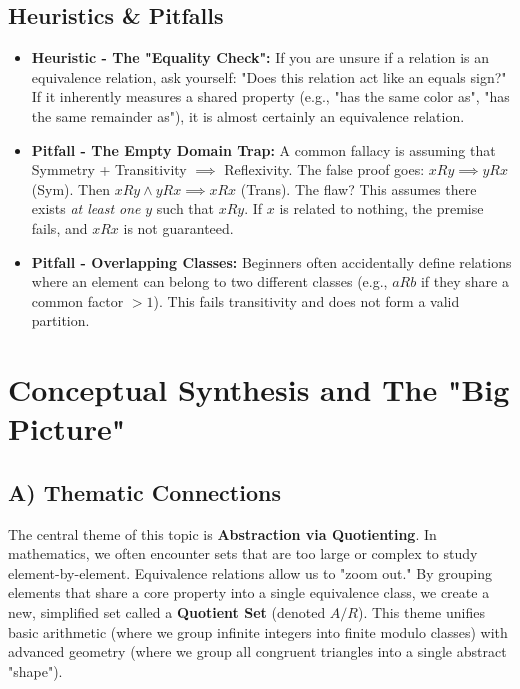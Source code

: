 \documentclass[11pt, a4paper]{article}
\theoremstyle{definition}
\theoremstyle{remark}
\begin{document}
\subsection{Heuristics \& Pitfalls}
\begin{itemize}
    \item \textbf{Heuristic - The "Equality Check":} If you are unsure if a relation is an equivalence relation, ask yourself: "Does this relation act like an equals sign?" If it inherently measures a shared property (e.g., "has the same color as", "has the same remainder as"), it is almost certainly an equivalence relation.
    \item \textbf{Pitfall - The Empty Domain Trap:} A common fallacy is assuming that Symmetry + Transitivity $\implies$ Reflexivity. The false proof goes: $xRy \implies yRx$ (Sym). Then $xRy \land yRx \implies xRx$ (Trans). The flaw? This assumes there exists \textit{at least one} $y$ such that $xRy$. If $x$ is related to nothing, the premise fails, and $xRx$ is not guaranteed.
    \item \textbf{Pitfall - Overlapping Classes:} Beginners often accidentally define relations where an element can belong to two different classes (e.g., $a R b$ if they share a common factor $>1$). This fails transitivity and does not form a valid partition.
\end{itemize}

\newpage

\section{Conceptual Synthesis and The "Big Picture"}

\subsection{A) Thematic Connections}
The central theme of this topic is \textbf{Abstraction via Quotienting}. In mathematics, we often encounter sets that are too large or complex to study element-by-element. Equivalence relations allow us to "zoom out." By grouping elements that share a core property into a single equivalence class, we create a new, simplified set called a \textbf{Quotient Set} (denoted $A/R$). This theme unifies basic arithmetic (where we group infinite integers into finite modulo classes) with advanced geometry (where we group all congruent triangles into a single abstract "shape").
\end{document}
